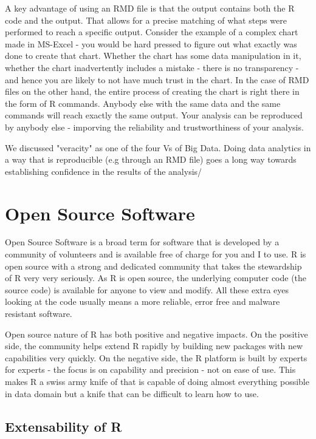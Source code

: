 \documentclass[11pt, letterpaper, twoside]{memoir}\usepackage{knitr}
\begin{document}
A key advantage of using an RMD file is that the output contains both the R code and the output. That allows for a precise matching of what steps were performed to reach a specific output. Consider the example of a complex chart made in MS-Excel - you would be hard pressed to figure out what exactly was done to create that chart. Whether the chart has some data manipulation in it, whether the chart inadvertently includes a mistake - there is no transparency - and hence you are likely to not have much trust in the chart. In the case of RMD files on the other hand, the entire process of creating the chart is right there in the form of R commands. Anybody else with the same data and the same commands will reach exactly the same output. Your analysis can be reproduced by anybody else - imporving the reliability and trustworthiness of your analysis.

We discussed "veracity" as one of the four Vs of Big Data. Doing data analytics in a way that is reproducible (e.g through an RMD file) goes a long way towards establishing confidence in the results of the analysis/

\section{Open Source Software}

Open Source Software is a broad term for software that is developed by a community of volunteers and is available free of charge for you and I to use. R is open source with a strong and dedicated community that takes the stewardship of R very very seriously. 
As R is open source, the underlying computer code (the source code) is available for anyone to view and modify. All these extra eyes looking at the code usually means a more reliable, error free and malware resistant software. 

Open source nature of R has both positive and negative impacts. On the positive side, the community helps extend R rapidly by building new packages with new capabilities very quickly. On the negative side, the R platform is built by experts for experts - the focus is on capability and precision - not on ease of use. This makes R a swiss army knife of that is capable of doing almost everything possible in data domain but a knife that can be difficult to learn how to use.

\subsection{Extensability of R}
\end{document}
